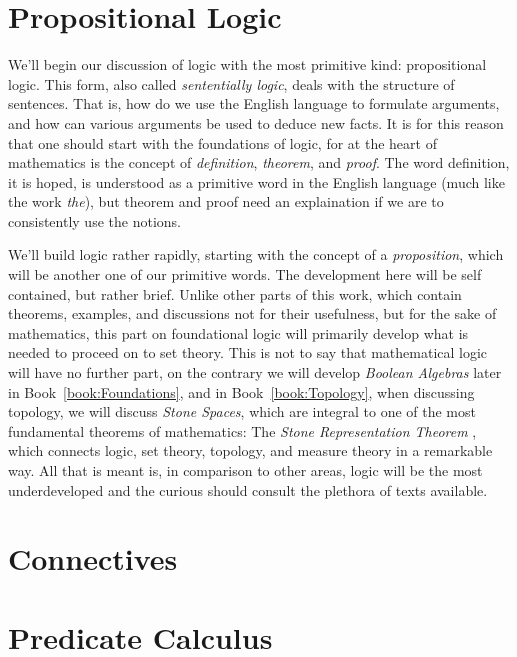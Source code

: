 \begingroup
    \ifcsname\PATH\endcsname
        \newcommand{\PATH}{books/Foundations/Logic}
        \newcommand{\OLDPATH}{\PATH}
    \else
        \newcommand{\OLDPATH}{\PATH}
        \renewcommand{\PATH}{books/Foundations/Logic}
    \fi
    \chapter{Propositional Logic}
        \label{chapt:Propositional_Logic}%
        We'll begin our discussion of logic with the most primitive kind:
        propositional logic. This form, also called
        \textit{sententially logic}, deals with the
        structure of sentences. That is, how do we use the English language to
        formulate arguments, and how can various arguments be used to deduce new
        facts. It is for this reason that one should start with the foundations
        of logic, for at the heart of mathematics is the concept of
        \textit{definition}, \textit{theorem}, and \textit{proof}. The word
        definition, it is hoped, is understood as a primitive word in the
        English language (much like the work \textit{the}), but theorem and
        proof need an explaination if we are to consistently use the notions.
        \par\hfill\par
        We'll build logic rather rapidly, starting with the concept of a
        \textit{proposition}, which will be
        another one of our primitive words. The development here will be self
        contained, but rather brief. Unlike other parts of this work, which
        contain theorems, examples, and discussions not for their usefulness,
        but for the sake of mathematics, this part on foundational logic will
        primarily develop what is needed to proceed on to set theory. This is
        not to say that mathematical logic will have
        no further part, on the contrary we will develop
        \textit{Boolean Algebras} later in
        Book~\ref{book:Foundations}, and in Book~\ref{book:Topology}, when
        discussing topology, we will discuss
        \textit{Stone Spaces}, which are integral to one of
        the most fundamental theorems of mathematics: The
        \textit{Stone Representation Theorem}%
        , which connects logic, set theory,
        topology, and measure theory in a remarkable way. All that is meant is,
        in comparison to other areas, logic will be the most underdeveloped and
        the curious should consult the plethora of texts available.
        
    \chapter{Connectives}
        \label{chapt:Connectives}%
        
    \chapter{Predicate Calculus}
        \label{chapt:Predicate_Calculus}
        
    \renewcommand{\PATH}{\OLDPATH}
\endgroup